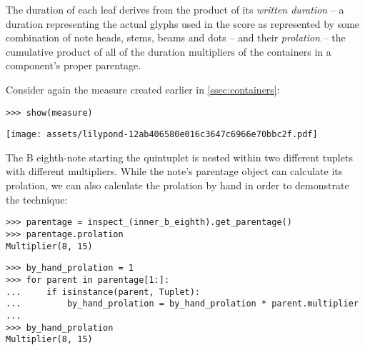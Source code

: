 \noindent The duration of each leaf derives from the product of its
\emph{written duration} -- a duration representing the actual glyphs used in
the score as represented by some combination of note heads, stems, beams and
dots -- and their \emph{prolation} -- the cumulative product of all of the
duration multipliers of the containers in a component's proper parentage.

Consider again the measure created earlier in \autoref{ssec:containers}:

\begin{comment}
<abjad>
show(measure)
</abjad>
\end{comment}

\begin{abjadbookoutput}
\begin{singlespacing}
\vspace{-0.5\baselineskip}
\begin{verbatim}
>>> show(measure)
\end{verbatim}
\noindent\texttt{[image: assets/lilypond-12ab406580e016c3647c6966e70bbc2f.pdf]}
\end{singlespacing}
\end{abjadbookoutput}

\noindent The B eighth-note starting the quintuplet is nested within two
different tuplets with different multipliers. While the note's parentage object
can calculate its prolation, we can also calculate the prolation by hand in
order to demonstrate the technique:

\begin{comment}
<abjad>
parentage = inspect_(inner_b_eighth).get_parentage()
parentage.prolation
by_hand_prolation = 1
for parent in parentage[1:]:
    if isinstance(parent, Tuplet):
        by_hand_prolation = by_hand_prolation * parent.multiplier

by_hand_prolation
</abjad>
\end{comment}

\begin{abjadbookoutput}
\begin{singlespacing}
\vspace{-0.5\baselineskip}
\begin{verbatim}
>>> parentage = inspect_(inner_b_eighth).get_parentage()
>>> parentage.prolation
Multiplier(8, 15)
\end{verbatim}
\begin{verbatim}
>>> by_hand_prolation = 1
>>> for parent in parentage[1:]:
...     if isinstance(parent, Tuplet):
...         by_hand_prolation = by_hand_prolation * parent.multiplier
...
>>> by_hand_prolation
Multiplier(8, 15)
\end{verbatim}
\end{singlespacing}
\end{abjadbookoutput}

